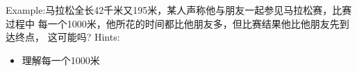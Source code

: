 \clearpage
Example:马拉松全长42千米又195米，某人声称他与朋友一起参见马拉松赛，比赛过程中
每一个1000米，他所花的时间都比他朋友多，但比赛结果他比他朋友先到达终点，
这可能吗?  
\clearpage
Hints:
\begin{itemize}
\item 理解每一个1000米 
\end{itemize}



